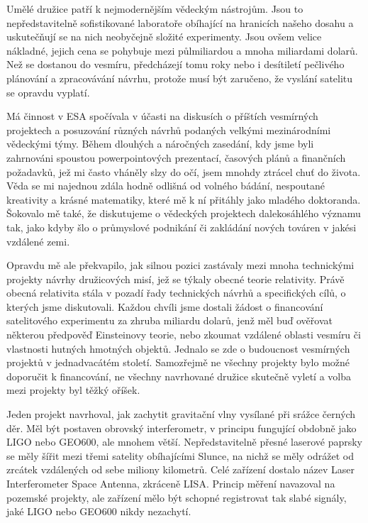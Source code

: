   Umělé družice patří k nejmodernějším vědeckým nástrojům. Jsou to nepředstavitelně sofistikované
  laboratoře obíhající na hranicích našeho dosahu a uskutečňují se na nich neobyčejně složité
  experimenty. Jsou ovšem velice nákladné, jejich cena se pohybuje mezi půlmiliardou a mnoha
  miliardami dolarů. Než se dostanou do vesmíru, předcházejí tomu roky nebo i desítiletí pečlivého
  plánování a zpracovávání návrhu, protože musí být zaručeno, že vyslání satelitu se opravdu
  vyplatí. 
  
  Má činnost v ESA spočívala v účasti na diskusích o příštích vesmírných projektech a posuzování
  různých návrhů podaných velkými mezinárodními vědeckými týmy. Během dlouhých a náročných zasedání,
  kdy jsme byli zahrnováni spoustou powerpointových prezentací, časových plánů a finančních
  požadavků, jež mi často vháněly slzy do očí, jsem mnohdy ztrácel chuť do života. Věda se mi
  najednou zdála hodně odlišná od volného bádání, nespoutané kreativity a krásné matematiky, které
  mě k ní přitáhly jako mladého doktoranda. Šokovalo mě také, že diskutujeme o vědeckých projektech
  dalekosáhlého významu tak, jako kdyby šlo o průmyslové podnikání či zakládání nových továren v
  jakési vzdálené zemi. 
  
  Opravdu mě ale překvapilo, jak silnou pozici zastávaly mezi mnoha technickými projekty návrhy
  družicových misí, jež se týkaly obecné teorie relativity. Právě obecná relativita stála v pozadí
  řady technických návrhů a specifických cílů, o kterých jsme diskutovali. Každou chvíli jsme
  dostali žádost o financování satelitového experimentu za zhruba miliardu dolarů, jenž měl buď
  ověřovat některou předpověď Einsteinovy teorie, nebo zkoumat vzdálené oblasti vesmíru či
  vlastnosti hutných hmotných objektů. Jednalo se zde o budoucnost vesmírných projektů v
  jednadvacátém století. Samozřejmě ne všechny projekty bylo možné doporučit k financování, ne
  všechny navrhované družice skutečně vyletí a volba mezi projekty byl těžký oříšek.
  
  Jeden projekt navrhoval, jak zachytit gravitační vlny vysílané při srážce černých děr. Měl být
  postaven obrovský interferometr, v principu fungující obdobně jako LIGO nebo GEO600, ale mnohem
  větší. Nepředstavitelně přesné laserové paprsky se měly šířit mezi třemi satelity obíhajícími
  Slunce, na nichž se měly odrážet od zrcátek vzdálených od sebe miliony kilometrů. Celé zařízení
  dostalo název Laser Interferometer Space Antenna, zkráceně LISA. Princip měření navazoval na
  pozemské projekty, ale zařízení mělo být schopné registrovat tak slabé signály, jaké LIGO nebo
  GEO600 nikdy nezachytí. 
  
